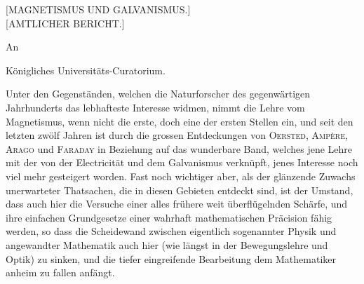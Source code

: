 \clearpage\begingroup{}\NoSourceHead
\begin{center}
{\Large [MAGNETISMUS UND GALVANISMUS.]}\\[1.5em]
{\large [AMTLICHER BERICHT.]}\par
\end{center}
\noindent\hspace*{3em}An
\begin{center}Königliches Universitäts-Curatorium.\end{center}
\begin{center}\end{center}
\noindent\hspace*{\parindent}Unter den Gegenständen, welchen die Naturforscher des gegenwärtigen
Jahrhunderts das lebhafteste Interesse widmen, nimmt die Lehre vom Magnetismus,
wenn nicht die erste, doch eine der ersten Stellen ein, und seit den
letzten zwölf Jahren ist durch die grossen Entdeckungen von \textsc{Oersted}, \textsc{Ampère},
\textsc{Arago} und \textsc{Faraday} in Beziehung auf das wunderbare Band, welches
jene Lehre mit der von der Electricität und dem Galvanismus verknüpft,
jenes Interesse noch viel mehr gesteigert worden. Fast noch wichtiger aber,
als der glänzende Zuwachs unerwarteter Thatsachen, die in diesen Gebieten
entdeckt sind, ist der Umstand, dass auch hier die Versuche einer alles frühere
weit überflügelnden Schärfe, und ihre einfachen Grundgesetze einer wahrhaft
mathematischen Präcision fähig werden, so dass die Scheidewand zwischen
eigentlich sogenannter Physik und angewandter Mathematik auch hier (wie
längst in der Bewegungslehre und Optik) zu sinken, und die tiefer eingreifende
Bearbeitung dem Mathematiker anheim zu fallen anfängt.

